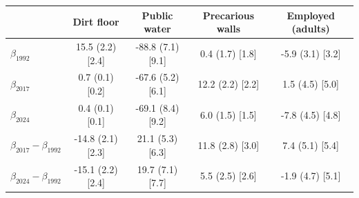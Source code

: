 \begin{tabular}{lcccc}
\toprule
 & Dirt floor & Public water & Precarious walls & Employed (adults) \\
\midrule
$\beta_{1992}$ & 15.5 (2.2) [2.4] & -88.8 (7.1) [9.1] & 0.4 (1.7) [1.8] & -5.9 (3.1) [3.2] \\
$\beta_{2017}$ & 0.7 (0.1) [0.2] & -67.6 (5.2) [6.1] & 12.2 (2.2) [2.2] & 1.5 (4.5) [5.0] \\
$\beta_{2024}$ & 0.4 (0.1) [0.1] & -69.1 (8.4) [9.2] & 6.0 (1.5) [1.5] & -7.8 (4.5) [4.8] \\
\midrule
$\beta_{2017}-\beta_{1992}$ & -14.8 (2.1) [2.3] & 21.1 (5.3) [6.3] & 11.8 (2.8) [3.0] & 7.4 (5.1) [5.4] \\
$\beta_{2024}-\beta_{1992}$ & -15.1 (2.2) [2.4] & 19.7 (7.1) [7.7] & 5.5 (2.5) [2.6] & -1.9 (4.7) [5.1] \\
\bottomrule
\end{tabular}
